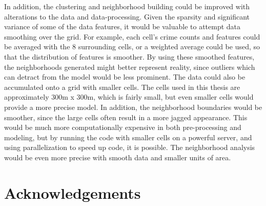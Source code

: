 \documentclass[times new roman,12pt]{article}
\begin{document}
In addition, the clustering and neighborhood building could be improved with alterations to the data and data-processing. Given the sparsity and significant variance of some of the data features, it would be valuable to attempt data smoothing over the grid. For example, each cell's crime counts and features could be averaged with the 8 surrounding cells, or a weighted average could be used, so that the distribution of features is smoother. By using these smoothed features, the neighborhoods generated might better represent reality, since outliers which can detract from the model would be less prominent. The data could also be accumulated onto a grid with smaller cells. The cells used in this thesis are approximately 300m x 300m, which is fairly small, but even smaller cells would provide a more precise model. In addition, the neighborhood boundaries would be smoother, since the large cells often result in a more jagged appearance. This would be much more computationally expensive in both pre-processing and modeling, but by running the code with smaller cells on a powerful server, and using parallelization to speed up code, it is possible. The neighborhood analysis would be even more precise with smooth data and smaller units of area. 

\newpage

\section{Acknowledgements}

\vspace{2mm}


\vspace{6mm}

\end{document}
